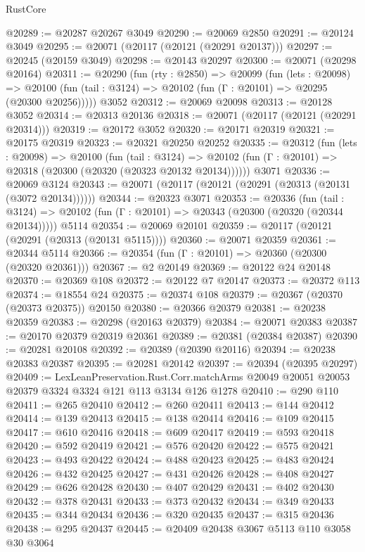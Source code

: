 \begin{lexlean}{RustCore}
\begin{coremodule}
@20289 := @20287 @20267 @3049
@20290 := @20069 @2850
@20291 := @20124 @3049
@20295 := @20071 (@20117 (@20121 (@20291 @20137)))
@20297 := @20245 (@20159 @3049)
@20298 := @20143 @20297
@20300 := @20071 (@20298 @20164)
@20311 := @20290
    (fun (rty : @2850) =>
    @20099
      (fun (lets : @20098) =>
      @20100 (fun (tail : @3124) => @20102 (fun (Γ : @20101) => @20295 (@20300 @20256)))))
    @3052
@20312 := @20069 @20098
@20313 := @20128 @3052
@20314 := @20313 @20136
@20318 := @20071 (@20117 (@20121 (@20291 @20314)))
@20319 := @20172 @3052
@20320 := @20171 @20319
@20321 := @20175 @20319
@20323 := @20321 @20250 @20252
@20335 := @20312
    (fun (lets : @20098) =>
    @20100
      (fun (tail : @3124) =>
      @20102 (fun (Γ : @20101) => @20318 (@20300 (@20320 (@20323 @20132 @20134))))))
    @3071
@20336 := @20069 @3124
@20343 := @20071 (@20117 (@20121 (@20291 (@20313 (@20131 (@3072 @20134))))))
@20344 := @20323 @3071
@20353 := @20336
    (fun (tail : @3124) => @20102 (fun (Γ : @20101) => @20343 (@20300 (@20320 (@20344 @20134)))))
    @5114
@20354 := @20069 @20101
@20359 := @20117 (@20121 (@20291 (@20313 (@20131 @5115))))
@20360 := @20071 @20359
@20361 := @20344 @5114
@20366 := @20354 (fun (Γ : @20101) => @20360 (@20300 (@20320 @20361)))
@20367 := @2 @20149
@20369 := @20122 @24 @20148
@20370 := @20369 @108
@20372 := @20122 @7 @20147
@20373 := @20372 @113
@20374 := @18554 @24
@20375 := @20374 @108
@20379 := @20367 (@20370 (@20373 @20375)) @20150
@20380 := @20366 @20379
@20381 := @20238 @20359
@20383 := @20298 (@20163 @20379)
@20384 := @20071 @20383
@20387 := @20170 @20379 @20319 @20361
@20389 := @20381 (@20384 @20387)
@20390 := @20281 @20108
@20392 := @20389 (@20390 @20116)
@20394 := @20238 @20383 @20387
@20395 := @20281 @20142
@20397 := @20394 (@20395 @20297)
@20409 := LexLeanPreservation.Rust.Corr.matchArms
    @20049
    @20051
    @20053
    @20379
    @3324
    @3324
    @121
    @113
    @3134
    @126
    @1278
@20410 := @290 @110
@20411 := @265 @20410
@20412 := @260 @20411
@20413 := @144 @20412
@20414 := @139 @20413
@20415 := @138 @20414
@20416 := @109 @20415
@20417 := @610 @20416
@20418 := @609 @20417
@20419 := @593 @20418
@20420 := @592 @20419
@20421 := @576 @20420
@20422 := @575 @20421
@20423 := @493 @20422
@20424 := @488 @20423
@20425 := @483 @20424
@20426 := @432 @20425
@20427 := @431 @20426
@20428 := @408 @20427
@20429 := @626 @20428
@20430 := @407 @20429
@20431 := @402 @20430
@20432 := @378 @20431
@20433 := @373 @20432
@20434 := @349 @20433
@20435 := @344 @20434
@20436 := @320 @20435
@20437 := @315 @20436
@20438 := @295 @20437
@20445 := @20409 @20438 @3067 @5113 @110 @3058 @30 @3064

\end{coremodule}
\end{lexlean}
